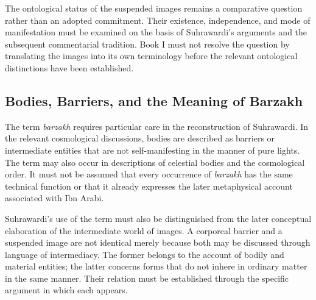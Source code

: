\label{para:VS.B01.P01.C08.S14.SS13.P005}

The ontological status of the suspended
images remains a comparative
question rather than an adopted
commitment. Their existence,
independence, and mode of
manifestation must be examined
on the basis of Suhrawardi's
arguments and the subsequent
commentarial tradition. Book I
must not resolve the question
by translating the images into
its own terminology before the
relevant ontological distinctions
have been established.


\subsection{Bodies, Barriers, and the Meaning of Barzakh}
\label{sec:ch08-s14-ss14}

\label{para:VS.B01.P01.C08.S14.SS14.P001}

The term \textit{barzakh} requires particular
care in the reconstruction of Suhrawardi.
In the relevant cosmological discussions,
bodies are described as barriers or
intermediate entities that are not
self-manifesting in the manner of
pure lights. The term may also occur
in descriptions of celestial bodies
and the cosmological order. It must
not be assumed that every occurrence
of \textit{barzakh} has the same
technical function or that it already
expresses the later metaphysical
account associated with Ibn Arabi.

\label{para:VS.B01.P01.C08.S14.SS14.P002}

Suhrawardi's use of the term must also
be distinguished from the later
conceptual elaboration of the
intermediate world of images.
A corporeal barrier and a suspended
image are not identical merely
because both may be discussed
through language of intermediacy.
The former belongs to the account
of bodily and material entities;
the latter concerns forms that
do not inhere in ordinary matter
in the same manner. Their relation
must be established through
the specific argument in which
each appears.

\label{para:VS.B01.P01.C08.S14.SS14.P003}

